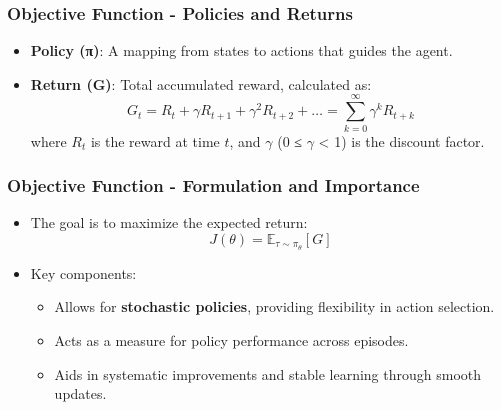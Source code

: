 \documentclass[aspectratio=169]{beamer}
\begin{document}
\begin{frame}[fragile]
  \frametitle{Objective Function - Policies and Returns}
  \begin{itemize}
    \item \textbf{Policy (π)}: A mapping from states to actions that guides the agent.
    \item \textbf{Return (G)}: Total accumulated reward, calculated as:
    \begin{equation}
      G_t = R_t + \gamma R_{t+1} + \gamma^2 R_{t+2} + \ldots = \sum_{k=0}^{\infty} \gamma^k R_{t+k}
    \end{equation}
    where \( R_t \) is the reward at time \( t \), and \( \gamma \) (0 ≤ \( \gamma \) < 1) is the discount factor.
  \end{itemize}
\end{frame}

\begin{frame}[fragile]
  \frametitle{Objective Function - Formulation and Importance}
  \begin{itemize}
    \item The goal is to maximize the expected return:
    \begin{equation}
      J(\theta) = \mathbb{E}_{\tau \sim \pi_\theta} \left[ G \right]
    \end{equation}
    \item Key components:
    \begin{itemize}
      \item Allows for \textbf{stochastic policies}, providing flexibility in action selection.
      \item Acts as a measure for policy performance across episodes.
      \item Aids in systematic improvements and stable learning through smooth updates.
    \end{itemize}
  \end{itemize}
\end{frame}
\end{document}
